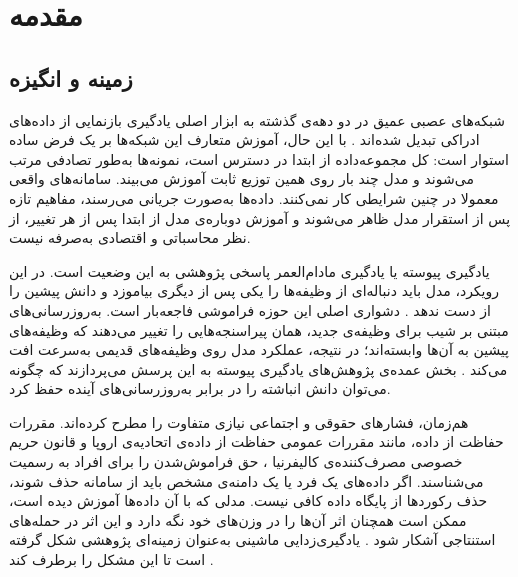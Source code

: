 
\chapter{مقدمه}
\label{ch:intro}

\section{زمینه و انگیزه}
\label{sec:intro-motivation}

شبکه‌های عصبی عمیق در دو دهه‌ی گذشته به ابزار اصلی یادگیری بازنمایی از داده‌های ادراکی تبدیل شده‌اند \cite{lecun2015deep,goodfellow2016deep}. با این حال، آموزش متعارف این شبکه‌ها بر یک فرض ساده استوار است: کل مجموعه‌داده از ابتدا در دسترس است، نمونه‌ها به‌طور تصادفی مرتب می‌شوند و مدل چند بار روی همین توزیع ثابت آموزش می‌بیند. سامانه‌های واقعی معمولا در چنین شرایطی کار نمی‌کنند. داده‌ها به‌صورت جریانی می‌رسند، مفاهیم تازه پس از استقرار مدل ظاهر می‌شوند و آموزش دوباره‌ی مدل از ابتدا پس از هر تغییر، از نظر محاسباتی و اقتصادی به‌صرفه نیست.

{یادگیری پیوسته} یا {یادگیری مادام‌العمر} پاسخی پژوهشی به این وضعیت است. در این رویکرد، مدل باید دنباله‌ای از وظیفه‌ها را یکی پس از دیگری بیاموزد و دانش پیشین را از دست ندهد \cite{thrun1998lifelong,parisi2019continual,delange2022survey}. دشواری اصلی این حوزه {فراموشی فاجعه‌بار} است. به‌روزرسانی‌های مبتنی بر شیب برای وظیفه‌ی جدید، همان پیراسنجه‌هایی را تغییر می‌دهند که وظیفه‌های پیشین به آن‌ها وابسته‌اند؛ در نتیجه، عملکرد مدل روی وظیفه‌های قدیمی به‌سرعت افت می‌کند \cite{mccloskey1989catastrophic,kirkpatrick2017overcoming}. بخش عمده‌ی پژوهش‌های یادگیری پیوسته به این پرسش می‌پردازند که چگونه می‌توان دانش انباشته را در برابر به‌روزرسانی‌های آینده حفظ کرد.

هم‌زمان، فشارهای حقوقی و اجتماعی نیازی متفاوت را مطرح کرده‌اند. مقررات حفاظت از داده، مانند {مقررات عمومی حفاظت از داده‌ی اتحادیه‌ی اروپا} \cite{gdpr2016} و {قانون حریم خصوصی مصرف‌کننده‌ی کالیفرنیا} \cite{ccpa2018}، {حق فراموش‌شدن} را برای افراد به رسمیت می‌شناسند. اگر داده‌های یک فرد یا یک دامنه‌ی مشخص باید از سامانه حذف شوند، حذف رکوردها از پایگاه داده کافی نیست. مدلی که با آن داده‌ها آموزش دیده است، ممکن است همچنان اثر آن‌ها را در وزن‌های خود نگه دارد و این اثر در حمله‌های استنتاجی آشکار شود \cite{shokri2017membership,carlini2022membership}. {یادگیری‌زدایی ماشینی} به‌عنوان زمینه‌ای پژوهشی شکل گرفته است تا این مشکل را برطرف کند \cite{cao2015towards,bourtoule2021machine}.

